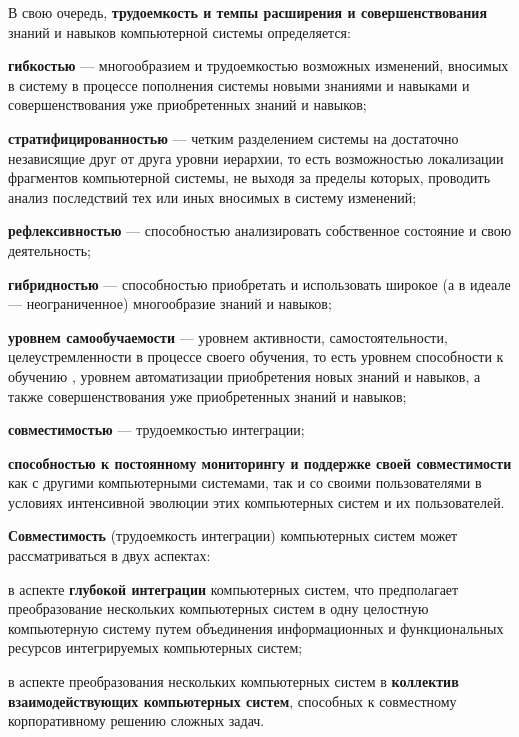 В свою очередь, \textbf{трудоемкость и темпы расширения и совершенствования} знаний и навыков компьютерной системы определяется:
\begin{textitemize}
	\item \textbf{гибкостью} --- многообразием и трудоемкостью возможных изменений, вносимых в систему в процессе пополнения системы новыми знаниями и навыками и совершенствования уже приобретенных знаний и навыков;
	\item \textbf{стратифицированностью} --- четким разделением системы на достаточно независящие друг от друга уровни иерархии, то есть возможностью локализации фрагментов компьютерной системы, не выходя за пределы которых,  проводить анализ последствий тех или иных вносимых в систему изменений;
	\item \textbf{рефлексивностью} --- способностью анализировать собственное состояние и свою деятельность;
	\item \textbf{гибридностью} --- способностью приобретать и использовать широкое (а в идеале --- неограниченное) многообразие знаний и навыков;
	\item \textbf{уровнем самообучаемости} --- уровнем активности, самостоятельности, целеустремленности в процессе своего обучения, то есть уровнем способности к обучению , уровнем автоматизации приобретения новых знаний и навыков, а также совершенствования уже приобретенных знаний и навыков;
	\item \textbf{совместимостью} --- трудоемкостью интеграции;
	\item \textbf{способностью к постоянному мониторингу и поддержке своей совместимости} как с другими компьютерными системами, так и со своими пользователями в условиях интенсивной эволюции этих компьютерных систем и их пользователей. 
\end{textitemize}

\textbf{Совместимость} (трудоемкость интеграции) компьютерных систем может рассматриваться в двух аспектах:
\begin{textitemize}
	\item в аспекте \textbf{глубокой интеграции} компьютерных систем, что предполагает преобразование нескольких компьютерных систем в одну целостную компьютерную систему путем объединения информационных и функциональных ресурсов интегрируемых компьютерных систем;
	\item в аспекте преобразования нескольких компьютерных систем в \textbf{коллектив взаимодействующих компьютерных систем}, способных к совместному корпоративному решению сложных задач.
\end{textitemize}


